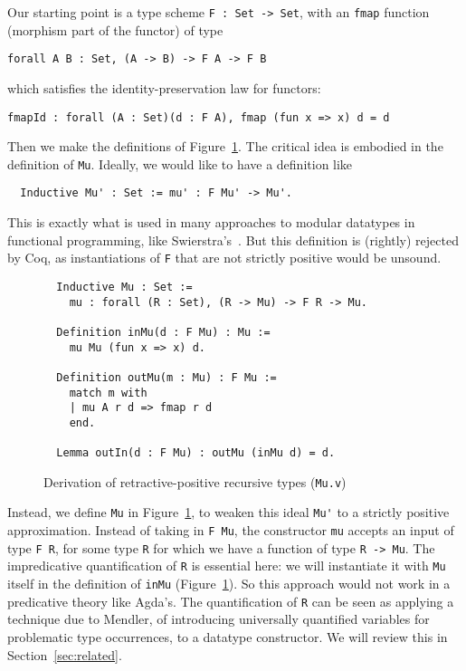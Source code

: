 \documentclass[a4paper,USenglish]{lipics-v2021}
\begin{document}
Our starting point is a type scheme \verb|F : Set -> Set|, with an \verb|fmap| function
(morphism part of the functor) of type
\begin{verbatim}
forall A B : Set, (A -> B) -> F A -> F B
\end{verbatim}
\noindent which satisfies the identity-preservation law for functors:
\begin{verbatim}
fmapId : forall (A : Set)(d : F A), fmap (fun x => x) d = d
\end{verbatim}
\noindent Then we make the definitions of Figure~\ref{fig:mu}.  The critical
idea is embodied in the definition of \verb|Mu|.  Ideally, we would like
to have a definition like
\begin{verbatim}
  Inductive Mu' : Set := mu' : F Mu' -> Mu'.
\end{verbatim}
\noindent This is exactly what is used in many approaches to modular
datatypes in functional programming, like
Swierstra's~\cite{swierstra08}.  But this definition is (rightly)
rejected by Coq, as instantiations of
\verb|F| that are not strictly positive would be unsound.

\begin{figure}
\begin{verbatim}
  Inductive Mu : Set := 
    mu : forall (R : Set), (R -> Mu) -> F R -> Mu.

  Definition inMu(d : F Mu) : Mu :=
    mu Mu (fun x => x) d.

  Definition outMu(m : Mu) : F Mu :=
    match m with
    | mu A r d => fmap r d
    end.

  Lemma outIn(d : F Mu) : outMu (inMu d) = d.
\end{verbatim}
\caption{Derivation of retractive-positive recursive types (\texttt{Mu.v})}
\label{fig:mu}
\end{figure}  


Instead, we define \verb|Mu| in Figure~\ref{fig:mu}, to weaken this
ideal \verb|Mu'| to a strictly positive approximation. Instead of taking in
\verb|F Mu|, the constructor \verb|mu| accepts an input of type
\verb|F R|, for some type \verb|R| for which we have a function of
type \verb|R -> Mu|.  The impredicative quantification of \verb|R| is
essential here: we will instantiate it with \verb|Mu| itself in the
definition of \verb|inMu| (Figure~\ref{fig:mu}).  So this approach
would not work in a predicative theory like Agda's.  The
quantification of \verb|R| can be seen as applying a technique due to
Mendler, of introducing universally quantified variables for
problematic type occurrences, to a datatype constructor.  We will
review this in Section~\ref{sec:related}.
\end{document}
